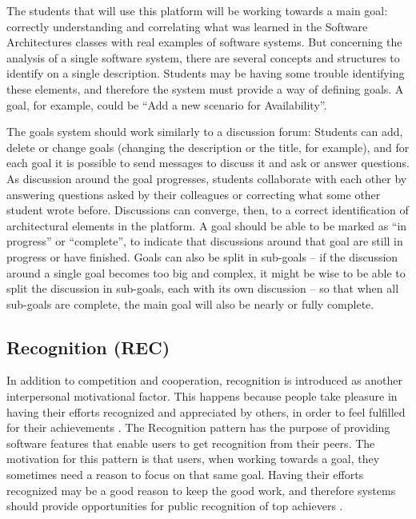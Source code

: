 The students that will use this platform will be working towards a main goal: correctly understanding and correlating what was learned in the Software Architectures classes with real examples of software systems. But concerning the analysis of a single software system, there are several concepts and structures to identify on a single description. Students may be having some trouble identifying these elements, and therefore the system must provide a way of defining goals. A goal, for example, could be ``Add a new scenario for Availability''. 

The goals system should work similarly to a discussion forum: Students can add, delete or change goals (changing the description or the title, for example), and for each goal it is possible to send messages to discuss it and ask or answer questions. As discussion around the goal progresses, students collaborate with each other by answering questions asked by their colleagues or correcting what some other student wrote before. Discussions can converge, then, to a correct identification of architectural elements in the platform. A goal should be able to be marked as ``in progress'' or ``complete'', to indicate that discussions around that goal are still in progress or have finished. 
Goals can also be split in sub-goals – if the discussion around a single goal becomes too big and complex, it might be wise to be able to split the discussion in sub-goals, each with its own discussion – so that when all sub-goals are complete, the main goal will also be nearly or fully complete. 

\subsection{Recognition (REC)}

In addition to competition and cooperation, recognition is introduced as another interpersonal motivational factor. This happens because people take pleasure in having their efforts recognized and appreciated by others, in order to feel fulfilled for their achievements \cite{malone1987making}. 
The Recognition pattern has the purpose of providing software features that enable users to get recognition from their peers. The motivation for this pattern is that users, when working towards a goal, they sometimes need a reason to focus on that same goal. Having their efforts recognized may be a good reason to keep the good work, and therefore systems should provide opportunities for public recognition of top achievers \cite{oduor2014persuasive}. 

